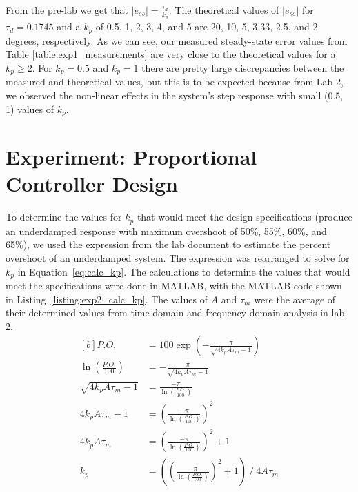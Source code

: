\documentclass[12pt]{article}
\begin{document}
From the pre-lab we get that $\left|e_{ss}\right| = \frac{\tau_d}{k_p}$. The theoretical values of $\left|e_{ss}\right|$ for $\tau_d = 0.1745$ and a $k_p$ of 0.5, 1, 2, 3, 4, and 5 are 20, 10, 5, 3.33, 2.5, and 2 degrees, respectively. As we can see, our measured steady-state error values from Table \ref{table:exp1_measurements} are very close to the theoretical values for a $k_p \geq 2$. For $k_p = 0.5$ and $k_p = 1$ there are pretty large discrepancies between the measured and theoretical values, but this is to be expected because from Lab 2, we observed the non-linear effects in the system's step response with small (0.5, 1) values of $k_p$.

\section{Experiment: Proportional Controller Design}
To determine the values for $k_p$ that would meet the design specifications (produce an underdamped response with maximum overshoot of 50\%, 55\%, 60\%, and 65\%), we used the expression from the lab document to estimate the percent overshoot of an underdamped system. The expression was rearranged to solve for $k_p$ in Equation~\ref{eq:calc_kp}. The calculations to determine the values that would meet the specifications were done in MATLAB, with the MATLAB code shown in Listing~\ref{listing:exp2_calc_kp}. The values of $A$ and $\tau_m$ were the average of their determined values from time-domain and frequency-domain analysis in lab 2.
\begin{equation} \label{eq:calc_kp}
\begin{aligned}[b]
    P.O. &= 100\exp\left( -\frac{\pi}{\sqrt{4k_pA\tau_m-1}} \right) \\
    \ln\left(\frac{P.O.}{100}\right) &= -\frac{\pi}{\sqrt{4k_pA\tau_m-1}} \\
    \sqrt{4k_pA\tau_m-1} &= \frac{-\pi}{\ln\left(\frac{P.O.}{100}\right)} \\
    4k_pA\tau_m - 1 &= \left(\frac{-\pi}{\ln\left(\frac{P.O.}{100}\right)}\right)^2 \\
    4k_pA\tau_m &= \left(\frac{-\pi}{\ln\left(\frac{P.O.}{100}\right)}\right)^2 + 1 \\
    k_p &= \left( \left(\frac{-\pi}{\ln\left(\frac{P.O.}{100}\right)}\right)^2 + 1 \right) \ / \ 4A\tau_m
\end{aligned}
\end{equation}

\end{document}
